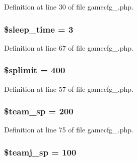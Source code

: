 Definition at line 30 of file gamecfg\+\_.\+php.

\hypertarget{gamecfg__1_8php_a6f658227d708591f1e627bed425d5fe3}{
\subsubsection[{\$sleep\+\_\+time}]{\setlength{\rightskip}{0pt plus 5cm}\$sleep\+\_\+time = 3}}\label{gamecfg__1_8php_a6f658227d708591f1e627bed425d5fe3}


Definition at line 67 of file gamecfg\+\_.\+php.

\hypertarget{gamecfg__1_8php_ad28374bc4466bb775d432260d548ffb3}{
\subsubsection[{\$splimit}]{\setlength{\rightskip}{0pt plus 5cm}\$splimit = 400}}\label{gamecfg__1_8php_ad28374bc4466bb775d432260d548ffb3}


Definition at line 57 of file gamecfg\+\_.\+php.

\hypertarget{gamecfg__1_8php_ad044b08a8aba2fc79d78b990297712e9}{
\subsubsection[{\$team\+\_\+sp}]{\setlength{\rightskip}{0pt plus 5cm}\$team\+\_\+sp = 200}}\label{gamecfg__1_8php_ad044b08a8aba2fc79d78b990297712e9}


Definition at line 75 of file gamecfg\+\_.\+php.

\hypertarget{gamecfg__1_8php_ae84ddd27032dbca15c3b3b50455b7d15}{
\subsubsection[{\$teamj\+\_\+sp}]{\setlength{\rightskip}{0pt plus 5cm}\$teamj\+\_\+sp = 100}}\label{gamecfg__1_8php_ae84ddd27032dbca15c3b3b50455b7d15}


